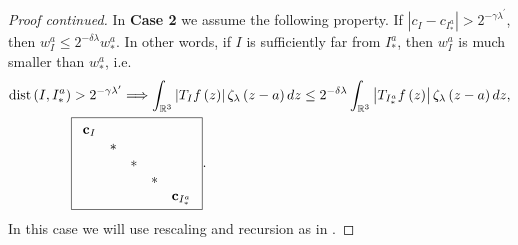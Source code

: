 \documentclass{amsart}%
\theoremstyle{plain}
\numberwithin{equation}{section}
\begin{document}
\begin{proof}
[Proof continued]In \textbf{Case 2} we assume the following property. If
$\left\vert c_{I}-c_{I_{\ast}^{a}}\right\vert >2^{-\gamma\lambda^{\prime}}$,
then $w_{I}^{a}\leq2^{-\delta\lambda}w_{\ast}^{a}$. In other words, if $I$ is
sufficiently far from $I_{\ast}^{a}$, then $w_{I}^{a}$ is much smaller than
$w_{\ast}^{a}$, i.e.%
\begin{align*}
\mathop{\rm dist}\left(  I,I_{\ast}^{a}\right)   &  >2^{-\gamma\lambda
^{\prime}}\Longrightarrow\int_{\mathbb{R}^{3}}\left\vert T_{I}f\left(
z\right)  \right\vert \zeta_{\lambda}\left(  z-a\right)  dz\leq2^{-\delta
\lambda}\int_{\mathbb{R}^{3}}\left\vert T_{I_{\ast}^{a}}f\left(  z\right)
\right\vert \zeta_{\lambda}\left(  z-a\right)  dz,\\
&  \fbox{$%
\begin{array}
[c]{ccccc}%
\mathbf{c}_{I} &  &  &  & \\
& \ast &  &  & \\
&  & \ast &  & \\
&  &  & \ast & \\
&  &  &  & \mathbf{c}_{I_{\ast}^{a}}%
\end{array}
$}.
\end{align*}
In this case we will use rescaling and recursion as in \cite{TaVaVe}.


\end{proof}
\end{document}
